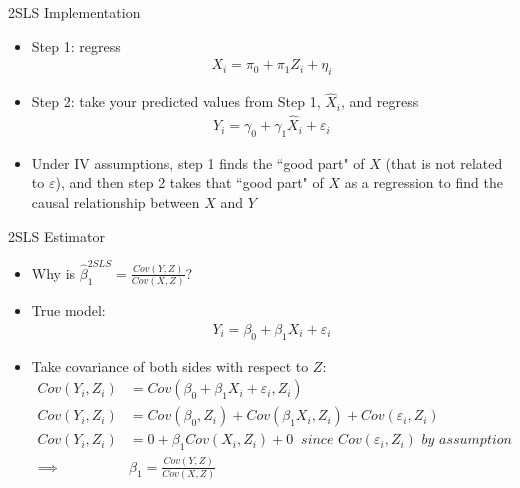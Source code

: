 \documentclass[aspectratio=169,11pt]{beamer}
\begin{document}
\begin{frame}{2SLS Implementation}
\begin{itemize}
\item Step 1: regress
\begin{align*}
X_i=\pi_0 + \pi_1 Z_i + \eta_i
\end{align*}
\item Step 2: take your predicted values from Step 1, $\hat{X}_i$, and regress
\begin{align*}
Y_i=\gamma_0 + \gamma_1 \hat{X}_i + \varepsilon_i
\end{align*}
\item Under IV assumptions, step 1 finds the ``good part" of $X$ (that is not related to $\varepsilon$), and then step 2 takes that ``good part" of $X$ as a regression to find the causal relationship between $X$ and $Y$
\end{itemize}
\end{frame}


\begin{frame}{2SLS Estimator}
\begin{itemize}
\item Why is $\hat{\beta}_1^{2SLS}=\frac{Cov(Y,Z)}{Cov(X,Z)}$?
\medskip
\item True model:
\begin{align*}
Y_i=\beta_0 + \beta_1 X_i + \varepsilon_i
\end{align*}
\item Take covariance of both sides with respect to $Z$:
\begin{align*}
Cov(Y_i, Z_i)&=Cov(\beta_0 + \beta_1 X_i + \varepsilon_i, Z_i) \\
Cov(Y_i, Z_i)& = Cov(\beta_0, Z_i) + Cov(\beta_1 X_i, Z_i) + Cov(\varepsilon_i, Z_i)\\
Cov(Y_i, Z_i)& = 0 + \beta_1Cov( X_i, Z_i) +0 \;\; \textit{since $Cov(\varepsilon_i, Z_i)$ by assumption} \\
\implies & \beta_1 =\frac{Cov(Y,Z)}{Cov(X,Z)}
\end{align*}
\end{itemize}
\end{frame}
\end{document}
